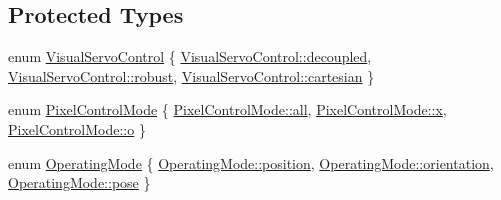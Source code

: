 \subsection*{Protected Types}
\begin{DoxyCompactItemize}
\item 
enum \hyperlink{classVisualServoingServer_ad7f000a91f0fc3423b86f2d2a584c4d3}{Visual\+Servo\+Control} \{ \hyperlink{classVisualServoingServer_ad7f000a91f0fc3423b86f2d2a584c4d3a8c5f04f9df63b44bea9b7edcb4dd1038}{Visual\+Servo\+Control\+::decoupled}, 
\hyperlink{classVisualServoingServer_ad7f000a91f0fc3423b86f2d2a584c4d3a00bd624b5b21d2b07edf398c1ce98b5e}{Visual\+Servo\+Control\+::robust}, 
\hyperlink{classVisualServoingServer_ad7f000a91f0fc3423b86f2d2a584c4d3a7949e6c02de2124dcdddd71b5430b8f0}{Visual\+Servo\+Control\+::cartesian}
 \}
\item 
enum \hyperlink{classVisualServoingServer_a3a1cce02f57cebb9056da5653d4dff0e}{Pixel\+Control\+Mode} \{ \hyperlink{classVisualServoingServer_a3a1cce02f57cebb9056da5653d4dff0eaa181a603769c1f98ad927e7367c7aa51}{Pixel\+Control\+Mode\+::all}, 
\hyperlink{classVisualServoingServer_a3a1cce02f57cebb9056da5653d4dff0ea9dd4e461268c8034f5c8564e155c67a6}{Pixel\+Control\+Mode\+::x}, 
\hyperlink{classVisualServoingServer_a3a1cce02f57cebb9056da5653d4dff0ead95679752134a2d9eb61dbd7b91c4bcc}{Pixel\+Control\+Mode\+::o}
 \}
\item 
enum \hyperlink{classVisualServoingServer_ab4ac95327e1829713374ca3cd0dec915}{Operating\+Mode} \{ \hyperlink{classVisualServoingServer_ab4ac95327e1829713374ca3cd0dec915a4757fe07fd492a8be0ea6a760d683d6e}{Operating\+Mode\+::position}, 
\hyperlink{classVisualServoingServer_ab4ac95327e1829713374ca3cd0dec915ada1639422ad8f355d2371428471379b5}{Operating\+Mode\+::orientation}, 
\hyperlink{classVisualServoingServer_ab4ac95327e1829713374ca3cd0dec915a2d5f8ae9328c6535be72ed28bff47560}{Operating\+Mode\+::pose}
 \}
\end{DoxyCompactItemize}
